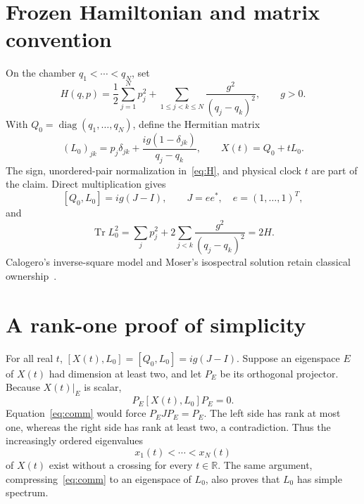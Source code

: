 \documentclass[9pt]{extarticle}
\begin{document}
\section{Frozen Hamiltonian and matrix convention}
On the chamber $q_1<\cdots<q_N$, set
\begin{equation}\label{eq:H}
 H(q,p)=\frac12\sum_{j=1}^N p_j^2+
 \sum_{1\le j<k\le N}\frac{g^2}{(q_j-q_k)^2},\qquad g>0.
\end{equation}
With $Q_0=\operatorname{diag}(q_1,\ldots,q_N)$, define the Hermitian matrix
\begin{equation}\label{eq:L}
 (L_0)_{jk}=p_j\delta_{jk}+
 \frac{ig(1-\delta_{jk})}{q_j-q_k},\qquad X(t)=Q_0+tL_0.
\end{equation}
The sign, unordered-pair normalization in~\eqref{eq:H}, and physical clock
$t$ are part of the claim.  Direct multiplication gives
\begin{equation}\label{eq:comm}
 [Q_0,L_0]=ig(J-I),\qquad J=ee^*,\quad e=(1,\ldots,1)^T,
\end{equation}
and
\begin{equation}\label{eq:energy}
 \operatorname{Tr}L_0^2=\sum_jp_j^2+2\sum_{j<k}
 \frac{g^2}{(q_j-q_k)^2}=2H.
\end{equation}
Calogero's inverse-square model and Moser's isospectral solution retain
classical ownership~\cite{C69,M75}.

\section{A rank-one proof of simplicity}
For all real $t$,
$[X(t),L_0]=[Q_0,L_0]=ig(J-I)$.  Suppose an eigenspace $E$ of $X(t)$ had
dimension at least two, and let $P_E$ be its orthogonal projector.  Because
$X(t)|_E$ is scalar,
\[
 P_E[X(t),L_0]P_E=0.
\]
Equation~\eqref{eq:comm} would force $P_EJP_E=P_E$.  The left side has rank
at most one, whereas the right side has rank at least two, a contradiction.
Thus the increasingly ordered eigenvalues
\[
 x_1(t)<\cdots<x_N(t)
\]
of $X(t)$ exist without a crossing for every $t\in\mathbb R$.  The same
argument, compressing~\eqref{eq:comm} to an eigenspace of $L_0$, also proves
that $L_0$ has simple spectrum.
\end{document}

